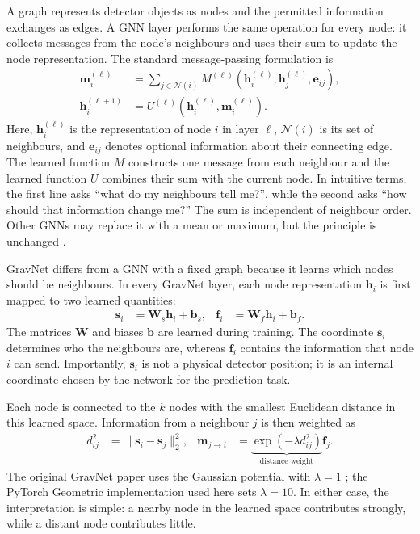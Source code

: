 A graph represents detector objects as nodes and the permitted information
exchanges as edges. A GNN layer performs the same operation for every node: it
collects messages from the node's neighbours and uses their sum to update the
node representation. The standard message-passing formulation is
\begin{align}
    \mathbf{m}_i^{(\ell)}
    &=
    \sum_{j\in\mathcal{N}(i)}
    M^{(\ell)}\!\left(
        \mathbf{h}_i^{(\ell)},
        \mathbf{h}_j^{(\ell)},
        \mathbf{e}_{ij}
    \right),
    \label{eq:generic_message}\\
    \mathbf{h}_i^{(\ell+1)}
    &=
    U^{(\ell)}\!\left(
        \mathbf{h}_i^{(\ell)},
        \mathbf{m}_i^{(\ell)}
    \right).
    \label{eq:generic_update}
\end{align}
Here, \(\mathbf{h}_i^{(\ell)}\) is the representation of node \(i\) in layer
\(\ell\), \(\mathcal{N}(i)\) is its set of neighbours, and
\(\mathbf{e}_{ij}\) denotes optional information about their connecting edge.
The learned function \(M\) constructs one message from each neighbour and the
learned function \(U\) combines their sum with the current node. In intuitive
terms, the first line asks ``what do my neighbours tell me?'', while the second
asks ``how should that information change me?'' The sum is independent of
neighbour order. Other GNNs may replace it with a mean or maximum, but the
principle is unchanged \cite{gilmer2017-message-passing,duarte2020-gnn-tracking}.

GravNet differs from a GNN with a fixed graph because it learns which nodes
should be neighbours. In every GravNet layer, each node representation
\(\mathbf{h}_i\) is first mapped to two learned quantities:
\begin{align}
    \mathbf{s}_i &= \mathbf{W}_s\mathbf{h}_i+\mathbf{b}_s,
    &
    \mathbf{f}_i &= \mathbf{W}_f\mathbf{h}_i+\mathbf{b}_f.
    \label{eq:gravnet_projections}
\end{align}
The matrices \(\mathbf{W}\) and biases \(\mathbf{b}\) are learned during
training. The coordinate \(\mathbf{s}_i\) determines who the neighbours are,
whereas \(\mathbf{f}_i\) contains the information that node \(i\) can send.
Importantly, \(\mathbf{s}_i\) is not a physical detector position; it is an
internal coordinate chosen by the network for the prediction task.

Each node is connected to the \(k\) nodes with the smallest Euclidean distance
in this learned space. Information from a neighbour \(j\) is then weighted as
\begin{align}
    d_{ij}^{2}
    &= \lVert\mathbf{s}_i-\mathbf{s}_j\rVert_2^2,
    &
    \mathbf{m}_{j\rightarrow i}
    &= \underbrace{\exp(-\lambda d_{ij}^{2})}_{\text{distance weight}}
       \mathbf{f}_j.
    \label{eq:gravnet_message}
\end{align}
The original GravNet paper uses the Gaussian potential with \(\lambda=1\)
\cite{qasim2019-gravnet}; the PyTorch Geometric implementation
\cite{fey2019-pytorch-geometric} used here sets \(\lambda=10\). In either case,
the interpretation is simple: a nearby node in the learned space contributes
strongly, while a distant node contributes little.

